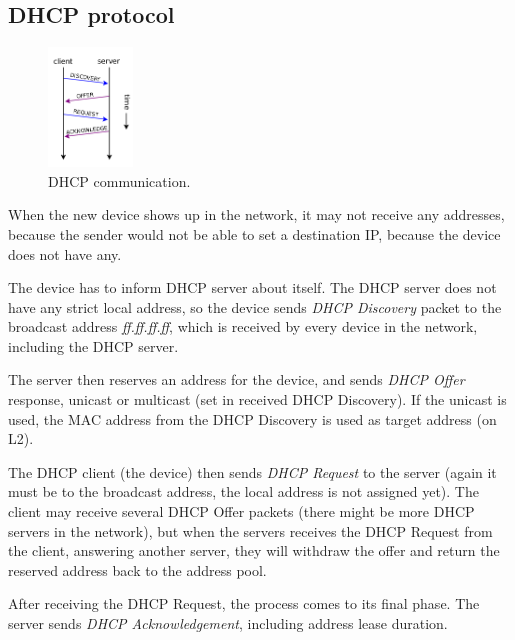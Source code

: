 \documentclass[10pt,a4paper,titlepage]{article}
\begin{document}
\subsection*{DHCP protocol}

\begin{figure}[h!]
    \begin{center}
        \includegraphics[width=0.2\textwidth]{dhcpcomm.png}
        \caption{ DHCP communication. \label{fig:triangle} \cite{DHCPcomm}}
    \end{center}
\end{figure}

When the new device shows up in the network, it may not receive any addresses,
because the sender would not be able to set a destination IP, because the
device does not have any.

The device has to inform DHCP server about itself. The DHCP server does not have
any strict local address, so the device sends {\it DHCP Discovery} packet to the
broadcast address {\it ff.ff.ff.ff}, which is received by every device in the
network, including the DHCP server.

The server then reserves an address for the device, and sends {\it DHCP Offer}
response, unicast or multicast (set in received DHCP Discovery). If the
unicast is used, the MAC address from the DHCP Discovery is used as target
address (on L2).

The DHCP client (the device) then sends {\it DHCP Request} to the server (again
it must be to the broadcast address, the local address is not assigned yet).
The client may receive several DHCP Offer packets (there might be more DHCP
servers in the network), but when the servers receives the DHCP Request from
the client, answering another server, they will withdraw the offer and return
the reserved address back to the address pool.

After receiving the DHCP Request, the process comes to its final phase. The server
sends {\it DHCP Acknowledgement}, including address lease duration.
\cite{DHCPwikipedia}



\printbibliography
\end{document}
